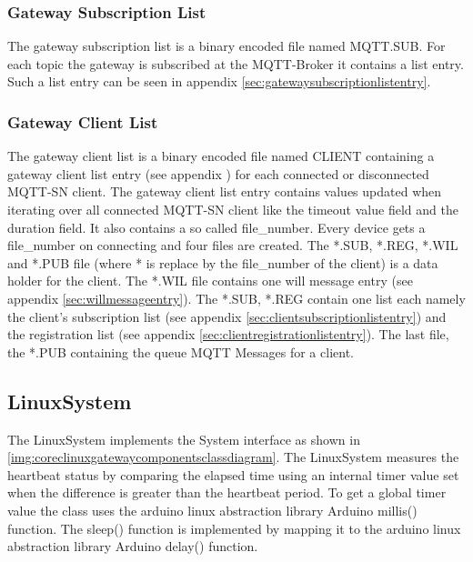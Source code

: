 \subsubsection{Gateway Subscription List}
The gateway subscription list is a binary encoded file named MQTT.SUB.
For each topic the gateway is subscribed at the MQTT-Broker it contains a list entry.
Such a list entry can be seen in appendix \autoref{sec:gatewaysubscriptionlistentry}.
\subsubsection{Gateway Client List}
The gateway client list is a binary encoded file named CLIENT containing a gateway client list entry (see appendix \label{sec:gatewayclientlistentry}) for each connected or disconnected MQTT-SN client.
The gateway client list entry contains values updated when iterating over all connected MQTT-SN client like the timeout value field and the duration field.
It also contains a so called file\_number.
Every device gets a file\_number on connecting and four files are created.
The *.SUB, *.REG, *.WIL and *.PUB file (where * is replace by the file\_number of the client) is a data holder for the client.
The *.WIL file contains one will message entry (see appendix \autoref{sec:willmessageentry}).
The *.SUB, *.REG contain one list each namely the client's subscription list (see appendix \autoref{sec:clientsubscriptionlistentry}) and the registration list (see appendix \autoref{sec:clientregistrationlistentry}).
The last file, the  *.PUB containing the queue MQTT Messages for a client.
\subsection{LinuxSystem}
The LinuxSystem implements the System interface as shown in \autoref{img:coreclinuxgatewaycomponentsclassdiagram}.
The LinuxSystem measures the heartbeat status by comparing the elapsed time using an internal timer value set when the difference is greater than the heartbeat period.
To get a global timer value the class uses the arduino linux abstraction library Arduino millis() function.
The sleep() function is implemented by mapping it to the arduino linux abstraction library Arduino delay() function.
